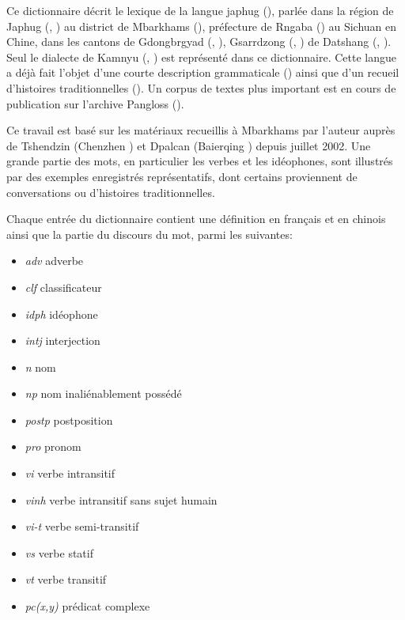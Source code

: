 Ce  dictionnaire décrit le lexique de la langue japhug (), parlée dans la région de Japhug (, ) au district de Mbarkhams (), préfecture de Rngaba () au Sichuan en Chine, dans les cantons de Gdongbrgyad (, ), Gsarrdzong (,   ) de Datshang (, ). Seul le dialecte de Kamnyu (, ) est représenté dans ce dictionnaire. Cette langue a déjà fait l'objet d'une courte description grammaticale (\citealt{jacques08}) ainsi que d'un recueil d'histoires traditionnelles (\citealt{jacques10gesar}). Un corpus de textes plus important est en cours de publication sur l'archive Pangloss (\citealt{michailovsky14pangloss}).

Ce travail est basé sur les matériaux recueillis à Mbarkhams par l'auteur auprès de Tshendzin (Chenzhen ) et Dpalcan (Baierqing ) depuis juillet 2002. Une grande partie des mots, en particulier les verbes et les idéophones, sont illustrés par des exemples enregistrés représentatifs, dont certains proviennent de conversations ou d'histoires traditionnelles.

Chaque entrée du dictionnaire contient une définition en français et en chinois ainsi que la partie du discours du mot, parmi les suivantes:

\begin{itemize}
\item \textit{adv} adverbe
\item \textit{clf} classificateur
\item \textit{idph} idéophone
\item \textit{intj} interjection
\item \textit{n} nom
\item \textit{np} nom inaliénablement possédé 
\item \textit{postp} postposition
\item \textit{pro} pronom
\item \textit{vi} verbe intransitif
\item \textit{vinh} verbe intransitif sans sujet humain
\item \textit{vi-t} verbe semi-transitif
\item \textit{vs} verbe statif
\item \textit{vt} verbe transitif
\item \textit{pc(x,y)} prédicat complexe 
\end{itemize}


